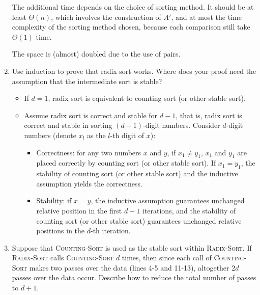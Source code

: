 \documentclass[12pt,reqno]{amsart}
\newif\ifanswer
\begin{document}
\begin{enumerate}[1.]
The additional time depends on the choice of sorting method. It should be at least $\Theta(n)$, which involves the construction of $A'$, and at most the time complexity of the sorting method chosen, because each comparison still take $\Theta(1)$ time.

The space is (almost) doubled due to the use of pairs.

\vspace{1cm}



\item Use induction to prove that radix sort works. Where does your proof need the assumption that the intermediate sort is stable?
\vspace{0.5cm}

\ifanswer
{}

\begin{itemize}
    \item If $d = 1$, radix sort is equivalent to counting sort (or other stable sort).
    \item Assume radix sort is correct and stable for $d - 1$, that is, radix sort is correct and stable in sorting $(d - 1)$-digit numbers. Consider $d$-digit numbers (denote $x_l$ as the $l$-th digit of $x$):
    \begin{itemize}
        \item Correctness: for any two numbers $x$ and $y$, if $x_1 \neq y_1$, $x_1$ and $y_1$ are placed correctly by counting sort (or other stable sort). If $x_1 = y_1$, the stability of counting sort (or other stable sort) and the inductive assumption yields the correctness.
        \item Stability: if $x = y$, the inductive assumption guarantees unchanged relative position in the first $d - 1$ iterations, and the stability of counting sort (or other stable sort) guarantees unchanged relative positions in the $d$-th iteration.
    \end{itemize}
\end{itemize}
\vspace{1cm}



\item Suppose that \textsc{Counting-Sort} is used as the stable sort within \textsc{Radix-Sort}. If \textsc{Radix-Sort} calls \textsc{Counting-Sort} $d$ times, then since each call of \textsc{Counting-Sort} makes two passes over the data (lines 4-5 and 11-13), altogether $2d$ passes over the data occur. Describe how to reduce the total number of passes to $d + 1$.
\vspace{0.5cm}


\end{enumerate}
\end{document}
